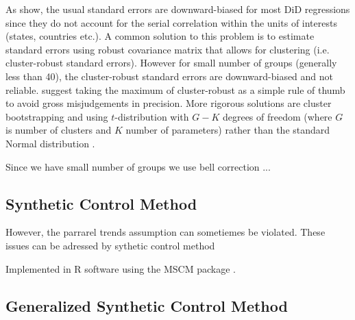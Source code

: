 As \citet{bertrand_how_2004} show, the usual standard errors  are downward-biased for most DiD regressions since they do not account for the serial correlation within the units of interests (states, countries etc.). A common solution to this problem is to estimate standard errors using robust covariance matrix that allows for clustering (i.e. cluster-robust standard errors). However for small number of groups (generally less than 40), the cluster-robust standard errors are downward-biased and not reliable. \citet[chapter 8]{angrist_mostly_2009} suggest taking the maximum of cluster-robust as a simple rule of thumb to avoid gross misjudgements in precision. More rigorous solutions are cluster bootstrapping \citep{cameron_bootstrap-based_2008, cameron_practitioners_2015} and  using $t$-distribution with $G- K$ degrees of freedom (where $G$ is number of clusters and $K$ number of parameters) rather than the standard Normal distribution \citep{mccaffrey_bias_2002, imbens_robust_2016}. 

Since we have small number of groups we use bell correction ...  



\subsection{Synthetic Control Method}
However, the parrarel trends assumption can sometiemes be violated. These issues can be adressed by sythetic control method
\citep{abadie_synthetic_2010, abadie_economic_2003}

Implemented in R software using the MSCM package \citep{becker_fast_2018}.
\subsection{Generalized Synthetic Control Method}
\citet{xu_generalized_2017}